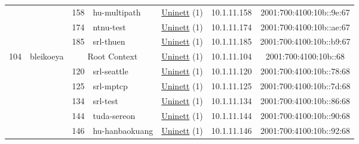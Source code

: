\begin{small}
\begin{center}
\begin{longtable}{|c|c|c|c|c|c|c|c|}
  &  & \tiny{158} & \multicolumn{1}{|l|}{\tiny{hu-multipath}} & \multicolumn{2}{|c|}{\tiny{\href{https://www.uninett.no}{Uninett} (1)}} & \tiny{10.1.11.158} & \tiny{2001:700:4100:10b::9e:67} \\* \cline{3-3}\cline{4-4}\cline{5-5}\cline{6-6}\cline{7-7}\cline{8-8}
  &  & \tiny{174} & \multicolumn{1}{|l|}{\tiny{ntnu-test}} & \multicolumn{2}{|c|}{\tiny{\href{https://www.uninett.no}{Uninett} (1)}} & \tiny{10.1.11.174} & \tiny{2001:700:4100:10b::ae:67} \\* \cline{3-3}\cline{4-4}\cline{5-5}\cline{6-6}\cline{7-7}\cline{8-8}
  &  & \tiny{185} & \multicolumn{1}{|l|}{\tiny{srl-thuen}} & \multicolumn{2}{|c|}{\tiny{\href{https://www.uninett.no}{Uninett} (1)}} & \tiny{10.1.11.185} & \tiny{2001:700:4100:10b::b9:67} \\ \hline
 \multirow{11}{*}{\tiny{104}} & \multicolumn{1}{|l|}{\multirow{11}{*}{\tiny{bleikoeya}}} & \multicolumn{2}{|c|}{\tiny{Root Context}} & \multicolumn{2}{|c|}{\tiny{\href{https://www.uninett.no}{Uninett} (1)}} & \tiny{10.1.11.104} & \tiny{2001:700:4100:10b::68} \\* \cline{3-3}\cline{4-4}\cline{5-5}\cline{6-6}\cline{7-7}\cline{8-8}
  &  & \tiny{120} & \multicolumn{1}{|l|}{\tiny{srl-seattle}} & \multicolumn{2}{|c|}{\tiny{\href{https://www.uninett.no}{Uninett} (1)}} & \tiny{10.1.11.120} & \tiny{2001:700:4100:10b::78:68} \\* \cline{3-3}\cline{4-4}\cline{5-5}\cline{6-6}\cline{7-7}\cline{8-8}
  &  & \tiny{125} & \multicolumn{1}{|l|}{\tiny{srl-mptcp}} & \multicolumn{2}{|c|}{\tiny{\href{https://www.uninett.no}{Uninett} (1)}} & \tiny{10.1.11.125} & \tiny{2001:700:4100:10b::7d:68} \\* \cline{3-3}\cline{4-4}\cline{5-5}\cline{6-6}\cline{7-7}\cline{8-8}
  &  & \tiny{134} & \multicolumn{1}{|l|}{\tiny{srl-test}} & \multicolumn{2}{|c|}{\tiny{\href{https://www.uninett.no}{Uninett} (1)}} & \tiny{10.1.11.134} & \tiny{2001:700:4100:10b::86:68} \\* \cline{3-3}\cline{4-4}\cline{5-5}\cline{6-6}\cline{7-7}\cline{8-8}
  &  & \tiny{144} & \multicolumn{1}{|l|}{\tiny{tuda-sereon}} & \multicolumn{2}{|c|}{\tiny{\href{https://www.uninett.no}{Uninett} (1)}} & \tiny{10.1.11.144} & \tiny{2001:700:4100:10b::90:68} \\* \cline{3-3}\cline{4-4}\cline{5-5}\cline{6-6}\cline{7-7}\cline{8-8}
  &  & \tiny{146} & \multicolumn{1}{|l|}{\tiny{hu-hanbaokuang}} & \multicolumn{2}{|c|}{\tiny{\href{https://www.uninett.no}{Uninett} (1)}} & \tiny{10.1.11.146} & \tiny{2001:700:4100:10b::92:68} \\* \cline{3-3}\cline{4-4}\cline{5-5}\cline{6-6}\cline{7-7}\cline{8-8}

\end{longtable}
\end{center}
\end{small}
